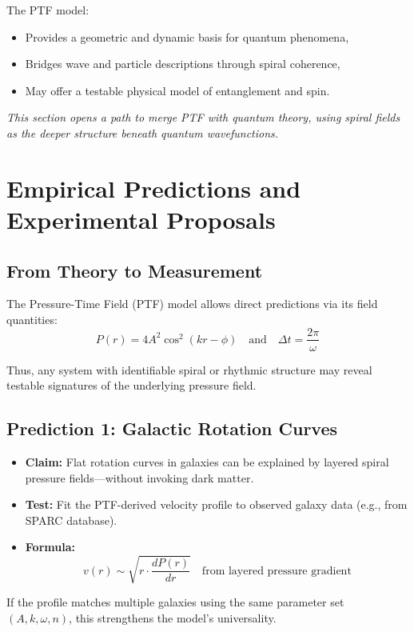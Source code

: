 \documentclass[a4paper,12pt]{article}
\begin{document}
The PTF model:
\begin{itemize}
    \item Provides a geometric and dynamic basis for quantum phenomena,
    \item Bridges wave and particle descriptions through spiral coherence,
    \item May offer a testable physical model of entanglement and spin.
\end{itemize}

\textit{This section opens a path to merge PTF with quantum theory, using spiral fields as the deeper structure beneath quantum wavefunctions.}

\section{Empirical Predictions and Experimental Proposals}
\label{sec:empirical}

\subsection{From Theory to Measurement}

The Pressure-Time Field (PTF) model allows direct predictions via its field quantities:
\[
P(r) = 4A^2 \cos^2(kr - \phi)
\quad \text{and} \quad
\Delta t = \frac{2\pi}{\omega}
\]

Thus, any system with identifiable spiral or rhythmic structure may reveal testable signatures of the underlying pressure field.

\subsection{Prediction 1: Galactic Rotation Curves}

\begin{itemize}
    \item \textbf{Claim:} Flat rotation curves in galaxies can be explained by layered spiral pressure fields—without invoking dark matter.
    \item \textbf{Test:} Fit the PTF-derived velocity profile to observed galaxy data (e.g., from SPARC database).
    \item \textbf{Formula:}
    \[
    v(r) \sim \sqrt{r \cdot \frac{dP(r)}{dr}} \quad \text{from layered pressure gradient}
    \]
\end{itemize}

If the profile matches multiple galaxies using the same parameter set \((A, k, \omega, n)\), this strengthens the model’s universality.
\end{document}
